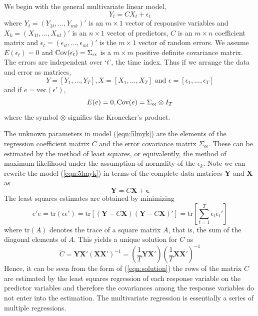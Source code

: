 We begin with the general multivariate linear model,
	\begin{equation}\label{eqn:5lmyk}
	Y_t = C X_t + \epsilon_t
	\end{equation}
where $Y_t=(Y_{1t},\ldots,Y_{mk})'$ is an $m \times 1$ vector of responsive variables and $X_k=(X_{1t},\ldots,X_{nt})'$ is an $n \times 1$ vector of predictors, $C$ is an $m \times n$ coefficient matrix and $\epsilon_t=(\epsilon_{it}, \ldots, \epsilon_{mt})'$ is the $m \times 1$ vector of random errors. We assume $E(\epsilon_t)=0$ and $\operatorname{Cov}(\epsilon_t)=\Sigma_{\epsilon \epsilon}$ is a $m \times m$ positive definite covariance matrix. The errors are independent over `$t$', the time index. Thus if we arrange the data and error as matrices,
	\begin{equation}\label{eqn:5yyt}
	Y=[Y_1,\ldots,Y_T], X=[X_1,\ldots,X_T] \text{ and }\epsilon=[\epsilon_1, \ldots,\epsilon_T]
	\end{equation}
and if $e=\text{vec}(\epsilon')$,
	\begin{equation}\label{eqn:5Ee0}
	E(e)=0, \Cov(e)= \Sigma_{\epsilon \epsilon} \otimes I_T
	\end{equation}
where the symbol $\otimes$ signifies the Kronecker's product. 


The unknown parameters in model (\ref{eqn:5lmyk}) are the elements of the regression coefficient matrix $C$ and the error covariance matrix $\Sigma_{\epsilon \epsilon}$. These can be estimated by the method of least squares, or equivalently, the method of maximum likelihood under the assumption of normality of the $\epsilon_k$. Note we can rewrite the model (\ref{eqn:5lmyk}) in terms of the complete data matrices $\mathbf{Y}$ and $\mathbf{X}$ as
	\begin{equation}\label{eqn:rewrite}
	\mathbf{Y} = C \mathbf{X} + \mathbf{\epsilon}
	\end{equation}
The least squares estimates are obtained by minimizing
	\begin{equation}\label{eqn:minimize}
	e'e=\text{tr}(\epsilon\epsilon')=\text{tr}[(\mathbf{Y}-C\mathbf{X})(\mathbf{Y}-C\mathbf{X})']=\text{tr}\left[\sum_{t=1}^T \epsilon_t \epsilon_t'\right]
	\end{equation}
where $\text{tr}(A)$ denotes the trace of a square matrix $A$, that is, the sum of the diagonal elements of $A$. This yields a unique solution for $C$ as
	\begin{equation}\label{eqn:solution}
	\tilde{C}=\mathbf{Y} \mathbf{X}' (\mathbf{X}\mathbf{X}')^{-1} = \left(\dfrac{1}{T} \mathbf{Y}\mathbf{X}'\right) \left(\dfrac{1}{T} \mathbf{X}\mathbf{X}' \right)^{-1}
	\end{equation}
Hence, it can be seen from the form of (\ref{eqn:solution}) the rows of the matrix $C$ are estimated by the least squares regression of each response variable on the predictor variables and therefore the covariances among the response variables do not enter into the estimation. The multivariate regression is essentially a series of multiple regressions. 


